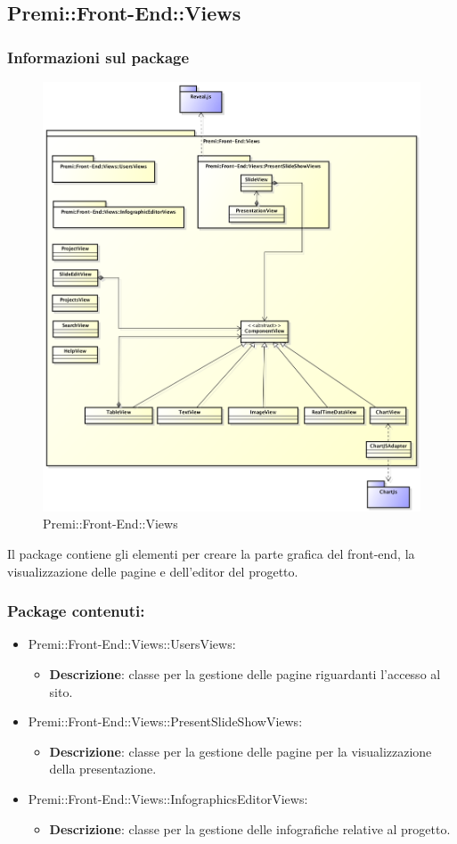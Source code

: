 \subsection{Premi::Front-End::Views}
	\subsubsection*{Informazioni sul package}
		\begin{figure}[h]
			\centering
			\includegraphics[width=0.7\linewidth]{img/front-end_views}
			\caption[Premi::Front-End::Views]{Premi::Front-End::Views}
		\end{figure}
		Il package contiene gli elementi per creare la parte grafica del \gls{front-end}, la visualizzazione delle pagine e dell'editor del progetto.

	\subsubsection*{Package contenuti:}

	\begin{itemize}
		\item Premi::Front-End::Views::UsersViews:
			\begin{itemize}
				\item \textbf{Descrizione}: classe per la gestione delle pagine riguardanti l'accesso al sito.
			\end{itemize}

		\item Premi::Front-End::Views::PresentSlideShowViews:
			\begin{itemize}
				\item \textbf{Descrizione}: classe per la gestione delle pagine per la visualizzazione della presentazione.
			\end{itemize}

		\item Premi::Front-End::Views::InfographicsEditorViews:
		\begin{itemize}
			\item \textbf{Descrizione}: classe per la gestione delle infografiche relative al progetto.
		\end{itemize}
	\end{itemize}

